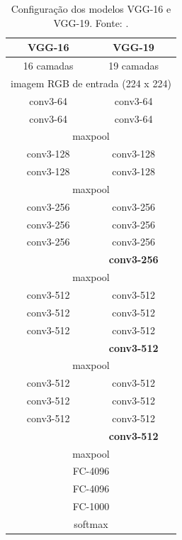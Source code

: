 \begin{table}[!htbp]
    \centering
    \footnotesize
    \begin{tabular}{|c|c|}
        \hline
        \textbf{VGG-16} & \textbf{VGG-19} \\
        \hline
        16 camadas & 19 camadas \\
        \hline
        \multicolumn{2}{|c|}{imagem RGB de entrada (224 x 224)} \\
        \hline
        conv3-64 & conv3-64 \\
        conv3-64 & conv3-64 \\
        \hline
        \multicolumn{2}{|c|}{maxpool} \\
        \hline
        conv3-128 & conv3-128 \\
        conv3-128 & conv3-128 \\
        \hline
        \multicolumn{2}{|c|}{maxpool} \\
        \hline
        conv3-256 & conv3-256 \\
        conv3-256 & conv3-256 \\
        conv3-256 & conv3-256 \\
         & \textbf{conv3-256} \\
        \hline
        \multicolumn{2}{|c|}{maxpool} \\
        \hline
        conv3-512 & conv3-512 \\
        conv3-512 & conv3-512 \\
        conv3-512 & conv3-512 \\
         & \textbf{conv3-512} \\
        \hline
        \multicolumn{2}{|c|}{maxpool} \\
        \hline
        conv3-512 & conv3-512 \\
        conv3-512 & conv3-512 \\
        conv3-512 & conv3-512 \\
         & \textbf{conv3-512} \\
        \hline
        \multicolumn{2}{|c|}{maxpool} \\
        \hline
        \multicolumn{2}{|c|}{FC-4096} \\
        \hline
        \multicolumn{2}{|c|}{FC-4096} \\
        \hline
        \multicolumn{2}{|c|}{FC-1000} \\
        \hline
        \multicolumn{2}{|c|}{softmax} \\
        \hline
    \end{tabular}
    \caption{Configuração dos modelos VGG-16 e VGG-19. Fonte: .}
    \label{tab:vgg-arch}
\end{table}

